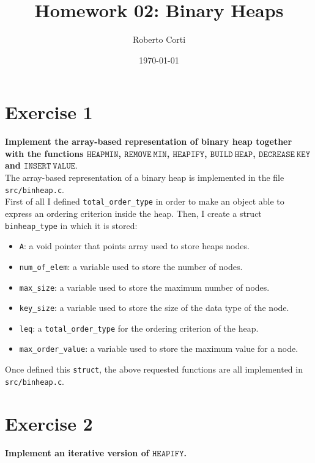 \documentclass{article}
\title{Homework 02: Binary Heaps}
\date{\today}
\author{Roberto Corti}
\begin{document}
	\maketitle
	
	\section*{Exercise 1}
	\textbf{Implement the array-based representation of binary heap together with the functions $\mathtt{HEAP MIN}$, $\mathtt{REMOVE ~ MIN}$, $\mathtt{HEAPIFY}$, $\mathtt{BUILD ~  HEAP}$, $\mathtt{DECREASE ~ KEY}$ and $\mathtt{INSERT ~ VALUE}$}. \\
	
	\noindent The array-based representation of a binary heap is implemented in the file \texttt{src/binheap.c}.  \\
	First of all I defined \texttt{total\_order\_type} in order to make an object able to express an ordering criterion inside the heap. Then, I create a struct \texttt{binheap\_type} in which it is stored:
	\begin{itemize}
		\item \texttt{A}: a void pointer that points array used to store heaps nodes.
		\item \texttt{num\_of\_elem}: a variable used to store the number of nodes.
		\item \texttt{max\_size}: a variable used to store the maximum number of nodes.
		\item \texttt{key\_size}: a variable used to store the size of the data type of the node.
		\item \texttt{leq}: a \texttt{total\_order\_type} for the ordering criterion of the heap.
		\item \texttt{max\_order\_value}: a variable used to store the maximum value for a node.
	\end{itemize}
Once defined this \texttt{struct}, the above requested functions are all implemented in \texttt{src/binheap.c}.
		
	\section*{Exercise 2}
	\textbf{Implement an iterative version of $\mathtt{HEAPIFY}$.} \\
	
\end{document}
